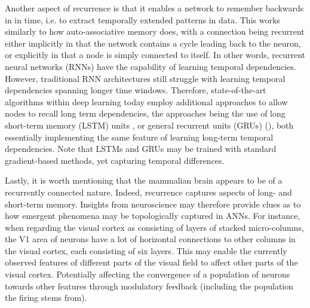 Another aspect of recurrence is that it enables a network to remember backwards in in time, i.e. to extract temporally extended patterns in data. This works similarly to how auto-associative memory does, with a connection being recurrent either implicitly in that the network contains a cycle leading back to the neuron, or explicitly in that a node is simply connected to itself. In other words, recurrent neural networks (RNNs) have the capability of learning temporal dependencies. However, traditional RNN architectures still struggle with learning temporal dependencies spanning longer time windows. Therefore, state-of-the-art algorithms within deep learning today employ additional approaches to allow nodes to recall long term dependencies, the approaches being the use of long short-term memory (LSTM) units \cite{Hochreiter1997}, or general recurrent units (GRUs) (\cite{Cho2014}), both essentially implementing the same feature of learning long-term temporal dependencies. Note that LSTMs and GRUs may be trained with standard gradient-based methods, yet capturing temporal differences.

Lastly, it is worth mentioning that the mammalian brain appears to be of a recurrently connected nature. Indeed, recurrence captures aspects of long- and short-term memory. Insights from neuroscience may therefore provide clues as to how emergent phenomena may be topologically captured in ANNs.
For instance, when regarding the visual cortex as consisting of layers of stacked micro-columns, the V1 area of neurons have a lot of horizontal connections to other columns in the visual cortex, each consisting of six layers. This may enable the currently observed features of different parts of the visual field to affect other parts of the visual cortex. Potentially affecting the convergence of a population of neurons towards other features through modulatory feedback (including the population the firing stems from).
\\

